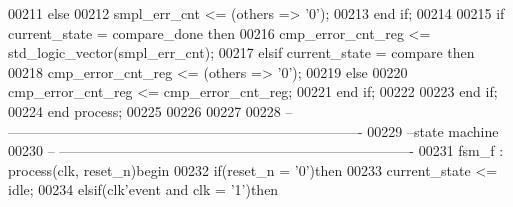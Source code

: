 \begin{DoxyCode}
00211          \textcolor{keywordflow}{else} 
00212             \textcolor{vhdlchar}{smpl_err_cnt} \textcolor{vhdlchar}{<=} \textcolor{vhdlchar}{(}\textcolor{keywordflow}{others} \textcolor{vhdlchar}{=}\textcolor{vhdlchar}{>} \textcolor{vhdlchar}{'}\textcolor{vhdllogic}{}\textcolor{vhdllogic}{0}\textcolor{vhdlchar}{'}\textcolor{vhdlchar}{)};
00213          \textcolor{keywordflow}{end} \textcolor{keywordflow}{if};
00214          
00215          \textcolor{keywordflow}{if} \textcolor{vhdlchar}{current_state} \textcolor{vhdlchar}{=} \textcolor{vhdlchar}{compare\_done} \textcolor{keywordflow}{then} 
00216             \textcolor{vhdlchar}{cmp_error_cnt_reg} \textcolor{vhdlchar}{<=} \textcolor{comment}{std\_logic\_vector}\textcolor{vhdlchar}{(}\textcolor{vhdlchar}{smpl_err_cnt}\textcolor{vhdlchar}{)};
00217          \textcolor{keywordflow}{elsif} \textcolor{vhdlchar}{current_state} \textcolor{vhdlchar}{=} \textcolor{vhdlchar}{compare} \textcolor{keywordflow}{then} 
00218             \textcolor{vhdlchar}{cmp_error_cnt_reg}  \textcolor{vhdlchar}{<=} \textcolor{vhdlchar}{(}\textcolor{keywordflow}{others} \textcolor{vhdlchar}{=}\textcolor{vhdlchar}{>} \textcolor{vhdlchar}{'}\textcolor{vhdllogic}{}\textcolor{vhdllogic}{0}\textcolor{vhdlchar}{'}\textcolor{vhdlchar}{)};
00219          \textcolor{keywordflow}{else} 
00220             \textcolor{vhdlchar}{cmp_error_cnt_reg} \textcolor{vhdlchar}{<=} \textcolor{vhdlchar}{cmp_error_cnt_reg};
00221          \textcolor{keywordflow}{end} \textcolor{keywordflow}{if};
00222              
00223       \textcolor{keywordflow}{end} \textcolor{keywordflow}{if};
00224    \textcolor{keywordflow}{end} \textcolor{keywordflow}{process};
00225    
00226    
00227 
00228 \textcolor{keyword}{-- ----------------------------------------------------------------------------}
00229 \textcolor{keyword}{--state machine}
00230 \textcolor{keyword}{-- ----------------------------------------------------------------------------}
00231 fsm\_f : \textcolor{keywordflow}{process}(clk, reset_n)\textcolor{keywordflow}{begin}
00232     \textcolor{keywordflow}{if}\textcolor{vhdlchar}{(}\textcolor{vhdlchar}{reset_n} \textcolor{vhdlchar}{=} \textcolor{vhdlchar}{'}\textcolor{vhdllogic}{}\textcolor{vhdllogic}{0}\textcolor{vhdlchar}{'}\textcolor{vhdlchar}{)}\textcolor{keywordflow}{then}
00233         \textcolor{vhdlchar}{current_state} \textcolor{vhdlchar}{<=} \textcolor{vhdlchar}{idle};
00234     \textcolor{keywordflow}{elsif}\textcolor{vhdlchar}{(}\textcolor{vhdlchar}{clk}\textcolor{vhdlchar}{'}\textcolor{vhdlkeyword}{event} \textcolor{keywordflow}{and} \textcolor{vhdlchar}{clk} \textcolor{vhdlchar}{=} \textcolor{vhdlchar}{'}\textcolor{vhdllogic}{}\textcolor{vhdllogic}{1}\textcolor{vhdlchar}{'}\textcolor{vhdlchar}{)}\textcolor{keywordflow}{then} 

\end{DoxyCode}
